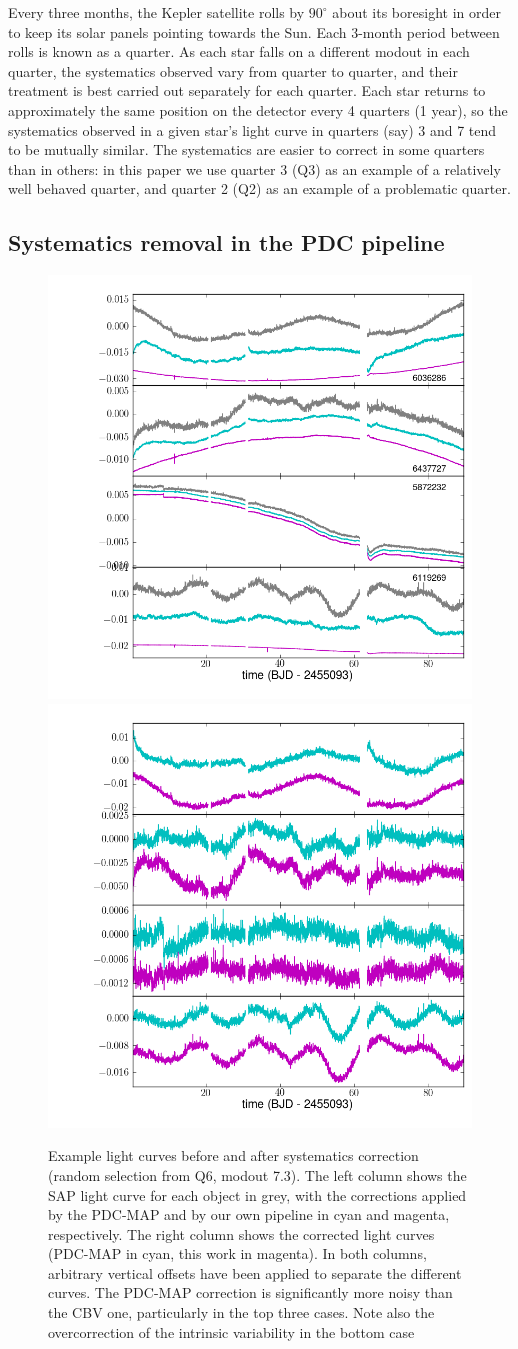 \documentclass[useAMS,usenatbib]{mn2e}
\begin{document}
Every three months, the Kepler satellite rolls by $90^{\circ}$ about its boresight
in order to keep its solar panels pointing towards the Sun. Each
3-month period between rolls is known as a quarter. As each star
falls on a different modout in each quarter, the systematics observed
vary from quarter to quarter, and their treatment is best
carried out separately for each quarter. Each star returns to
approximately the same position on the detector every 4 quarters (1
year), so the systematics observed in a given star's light curve in
quarters (say) 3 and 7 tend to be mutually similar. The systematics
are easier to correct in some quarters than in others: in this paper
we use quarter 3 (Q3) as an example of a relatively well behaved quarter,
and quarter 2 (Q2) as an example of a problematic quarter.

\subsection{Systematics removal in the PDC pipeline}
\label{sec:pdc}

\begin{figure}
  \centering
  \includegraphics[width=0.49\linewidth]{fig1a.png} \hfill
  \includegraphics[width=0.49\linewidth]{fig1b.png}
  \caption{Example light curves before and after systematics
    correction (random selection from Q6, modout 7.3). The left column shows the SAP light curve for each
    object in grey, with the corrections applied by the PDC-MAP and
    by our own pipeline in cyan and magenta, respectively. The right column
    shows the corrected light curves (PDC-MAP in cyan, this work in
    magenta). In both columns, arbitrary vertical offsets have been applied
    to separate the different curves. The PDC-MAP correction is
    significantly more noisy than the CBV one, particularly in the top
    three cases. Note also the overcorrection of the intrinsic
    variability in the bottom case}
  \label{fig:ex_pdc}
\end{figure}
\end{document}
